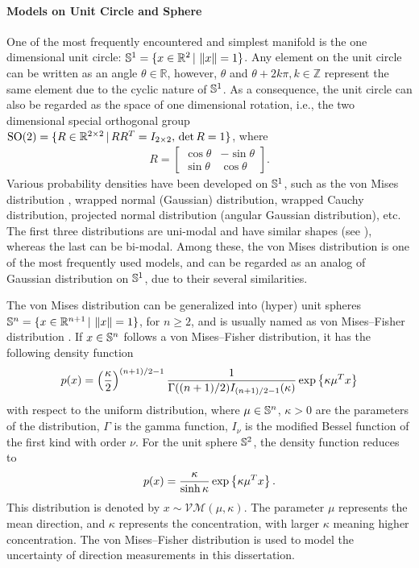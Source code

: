 \paragraph{Models on Unit Circle and Sphere}

One of the most frequently encountered and simplest manifold is the one dimensional unit circle: $\mathbb{S}^1 = \{ x\in\mathbb{R}^2 \,|\, \left\| x \right\| = 1 \}$.
Any element on the unit circle can be written as an angle $\theta\in\mathbb{R}$, however, $\theta$ and $\theta+2k\pi, k\in\mathbb{Z}$ represent the same element due to the cyclic nature of $\mathbb{S}^1$.
As a consequence, the unit circle can also be regarded as the space of one dimensional rotation, i.e., the two dimensional special orthogonal group $\mathrm{SO}(2) = \{ R\in\mathbb{R}^{2\times 2} \,|\, RR^T = I_{2\times 2},\, \det R = 1\}$, where
\begin{align*}
	R = \begin{bmatrix}
		\cos\theta & -\sin\theta \\
		\sin\theta & \cos\theta
	\end{bmatrix}.
\end{align*}
Various probability densities have been developed on $\mathbb{S}^1$, such as the von Mises distribution \cite{von1918uber}, wrapped normal (Gaussian) distribution, wrapped Cauchy distribution, projected normal distribution (angular Gaussian distribution), etc.
The first three distributions are uni-modal and have similar shapes (see \cite[Figure 3.3]{mardia2009directional}), whereas the last can be bi-modal.
Among these, the von Mises distribution is one of the most frequently used models, and can be regarded as an analog of Gaussian distribution on $\mathbb{S}^1$, due to their several similarities.

The von Mises distribution can be generalized into (hyper) unit spheres $\mathbb{S}^n = \{ x\in\mathbb{R}^{n+1} \,|\, \left\| x \right\|=1 \}$, for $n\geq 2$, and is usually named as von Mises--Fisher distribution \cite{fisher1953dispersion}.
If $x\in\mathbb{S}^n$ follows a von Mises--Fisher distribution, it has the following density function
\begin{align*}
	p(x) = \left(\frac{\kappa}{2}\right)^{(n+1)/2-1} \frac{1}{\Gamma((n+1)/2) I_{(n+1)/2-1}(\kappa)} \exp\left\{ \kappa\mu^T x \right\}
\end{align*}
with respect to the uniform distribution, where $\mu\in\mathbb{S}^n$, $\kappa>0$ are the parameters of the distribution, $\Gamma$ is the gamma function, $I_\nu$ is the modified Bessel function of the first kind with order $\nu$.
For the unit sphere $\mathbb{S}^2$, the density function reduces to
\begin{align}
	p(x) = \frac{\kappa}{\sinh\kappa} \exp\left\{ \kappa\mu^T x \right\}.
\end{align}
This distribution is denoted by $x\sim \mathcal{VM}(\mu,\kappa)$.
The parameter $\mu$ represents the mean direction, and $\kappa$ represents the concentration, with larger $\kappa$ meaning higher concentration.
The von Mises--Fisher distribution is used to model the uncertainty of direction measurements in this dissertation.


